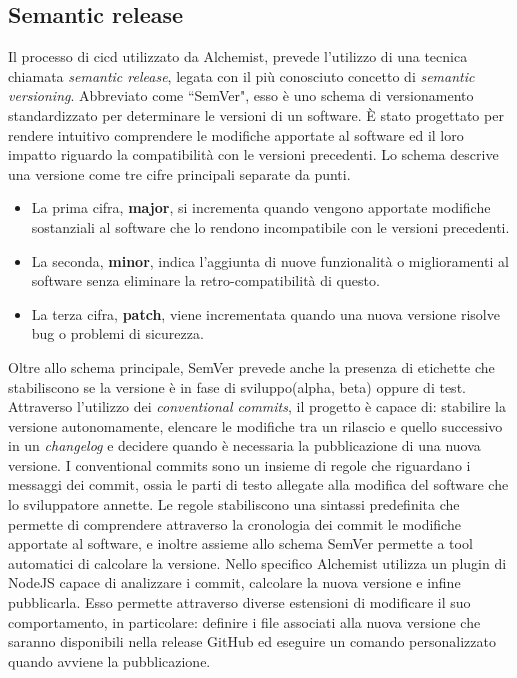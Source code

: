 \subsection{Semantic release}
Il processo di \ac{cicd} utilizzato da Alchemist, prevede l'utilizzo di una tecnica chiamata \textit{semantic release}, legata con il più conosciuto concetto di \textit{semantic versioning}. Abbreviato come ``SemVer", esso è uno schema di versionamento standardizzato per determinare le versioni di un software. È stato progettato per rendere intuitivo comprendere le modifiche apportate al software ed il loro impatto riguardo la compatibilità con le versioni precedenti. Lo schema descrive una versione come tre cifre principali separate da punti.
\begin{itemize}
	\item La prima cifra, \textbf{major}, si incrementa quando vengono apportate modifiche sostanziali al software che lo rendono incompatibile con le versioni precedenti.
	\item La seconda, \textbf{minor}, indica l'aggiunta di nuove funzionalità o miglioramenti al software senza eliminare la retro-compatibilità di questo.
	\item La terza cifra, \textbf{patch}, viene incrementata quando una nuova versione risolve bug o problemi di sicurezza.
\end{itemize}
Oltre allo schema principale, SemVer prevede anche la presenza di etichette che stabiliscono se la versione è in fase di sviluppo(alpha, beta) oppure di test.
Attraverso l'utilizzo dei \textit{conventional commits}, il progetto è capace di: stabilire la versione autonomamente, elencare le modifiche tra un rilascio e quello successivo in un \textit{changelog} e decidere quando è necessaria la pubblicazione di una nuova versione. I conventional commits sono un insieme di regole che riguardano i messaggi dei commit, ossia le parti di testo allegate alla modifica del software che lo sviluppatore annette. Le regole stabiliscono una sintassi predefinita che permette di comprendere attraverso la cronologia dei commit le modifiche apportate al software, e inoltre assieme allo schema SemVer permette a tool automatici di calcolare la versione. Nello specifico Alchemist utilizza un plugin di NodeJS capace di analizzare i commit, calcolare la nuova versione e infine pubblicarla. Esso permette attraverso diverse estensioni di modificare il suo comportamento, in particolare: definire i file associati alla nuova versione che saranno disponibili nella release GitHub ed eseguire un comando personalizzato quando avviene la pubblicazione.

